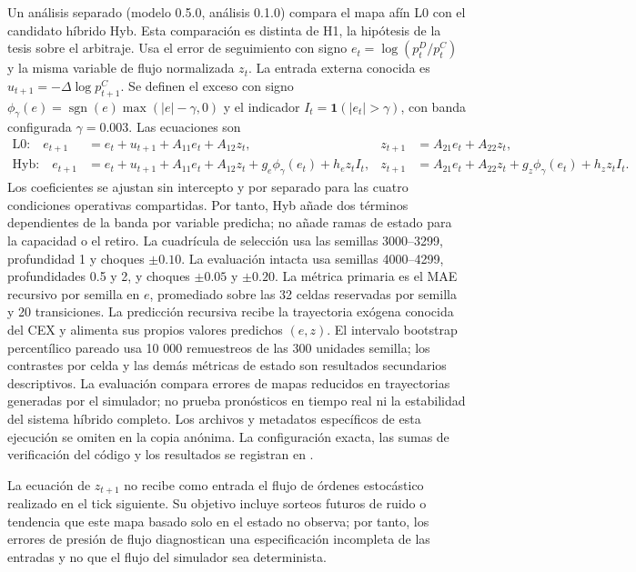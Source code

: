 Un análisis separado (modelo 0.5.0, análisis 0.1.0) compara el mapa afín L0 con el candidato híbrido Hyb. Esta comparación es distinta de H1, la hipótesis de la tesis sobre el arbitraje. Usa el error de seguimiento con signo $e_t=\log(p_t^D/p_t^C)$ y la misma variable de flujo normalizada $z_t$. La entrada externa conocida es $u_{t+1}=-\Delta\log p^C_{t+1}$. Se definen el exceso con signo $\phi_\gamma(e)=\operatorname{sgn}(e)\max(|e|-\gamma,0)$ y el indicador $I_t=\mathbf{1}(|e_t|>\gamma)$, con banda configurada $\gamma=0.003$. Las ecuaciones son
\begin{align}
  \text{L0:}\quad e_{t+1}&=e_t+u_{t+1}+A_{11} e_t+A_{12} z_t,& z_{t+1}&=A_{21} e_t+A_{22} z_t,\\
  \text{Hyb:}\quad e_{t+1}&=e_t+u_{t+1}+A_{11} e_t+A_{12} z_t+g_e\phi_\gamma(e_t)+h_e z_t I_t,&
  z_{t+1}&=A_{21} e_t+A_{22} z_t+g_z\phi_\gamma(e_t)+h_z z_t I_t.
\end{align}
Los coeficientes se ajustan sin intercepto y por separado para las cuatro condiciones operativas compartidas. Por tanto, Hyb añade dos términos dependientes de la banda por variable predicha; no añade ramas de estado para la capacidad o el retiro. La cuadrícula de selección usa las semillas 3000--3299, profundidad 1 y choques $\pm0.10$. La evaluación intacta usa semillas 4000--4299, profundidades 0.5 y 2, y choques $\pm0.05$ y $\pm0.20$. La métrica primaria es el MAE recursivo por semilla en $e$, promediado sobre las 32 celdas reservadas por semilla y 20 transiciones. La predicción recursiva recibe la trayectoria exógena conocida del CEX y alimenta sus propios valores predichos $(e,z)$. El intervalo bootstrap percentílico pareado usa 10 000 remuestreos de las 300 unidades semilla; los contrastes por celda y las demás métricas de estado son resultados secundarios descriptivos. La evaluación compara errores de mapas reducidos en trayectorias generadas por el simulador; no prueba pronósticos en tiempo real ni la estabilidad del sistema híbrido completo.
\ifdefined\blindreviewmode
Los archivos y metadatos específicos de esta ejecución se omiten en la copia anónima.
\else
La configuración exacta, las sumas de verificación del código y los resultados se registran en .
\fi

La ecuación de $z_{t+1}$ no recibe como entrada el flujo de órdenes estocástico realizado en el tick siguiente. Su objetivo incluye sorteos futuros de ruido o tendencia que este mapa basado solo en el estado no observa; por tanto, los errores de presión de flujo diagnostican una especificación incompleta de las entradas y no que el flujo del simulador sea determinista.

